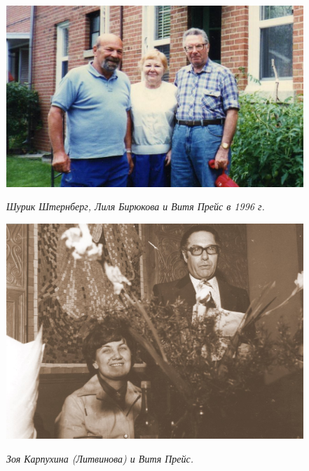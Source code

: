 \begin{figure}[h!]
    \noindent
    \begin{minipage}{65mm}
        \includegraphics[width=\linewidth]{inc/16/2} \begin{footnotesize}\textit{Шурик Штернберг, Лиля Бирюкова и Витя Прейс в 1996 г. }\end{footnotesize}
    \end{minipage}
    \hfill
    \begin{minipage}{55mm}
        \includegraphics[width=\linewidth]{inc/16/3} \begin{footnotesize}\textit{Зоя Карпухина (Литвинова) и Витя Прейс.}\end{footnotesize}
    \end{minipage}
\end{figure}

\onehalfspacing

